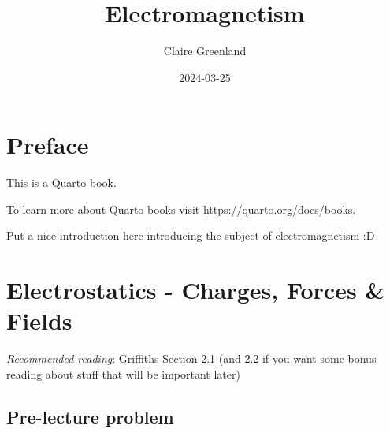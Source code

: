 \documentclass[
  letterpaper,
  DIV=11,
  numbers=noendperiod]{scrreprt}
\title{Electromagnetism}
\author{Claire Greenland}
\date{2024-03-25}
\renewcommand*\contentsname{Table of contents}
\newcommand\contentsname{Table of contents}
\begin{document}
\maketitle

\renewcommand*\contentsname{Table of contents}
{
\hypersetup{linkcolor=}
\setcounter{tocdepth}{2}
\tableofcontents
}

\chapter*{Preface}\label{preface}


This is a Quarto book.

To learn more about Quarto books visit
\url{https://quarto.org/docs/books}.

Put a nice introduction here introducing the subject of electromagnetism
:D


\chapter{Electrostatics - Charges, Forces \&
Fields}\label{electrostatics---charges-forces-fields}

\newcommand{\l}{\mathrm{\mathbf{l}}}
\newcommand{\E}{\mathrm{\mathbf{E}}}
\newcommand{\F}{\mathrm{\mathbf{F}}}
\newcommand{\r}{\mathrm{\mathbf{r}}}
\newcommand{\B}{\mathrm{\mathbf{B}}}
\newcommand{\A}{\mathrm{\mathbf{A}}}
\newcommand{\x}{\mathrm{\mathbf{x}}}
\newcommand{\y}{\mathrm{\mathbf{y}}}
\newcommand{\z}{\mathrm{\mathbf{z}}}
\newcommand{\v}{\mathrm{\mathbf{v}}}
\newcommand{\p}{\mathrm{\mathbf{p}}}
\newcommand{\d}{\mathrm{\mathbf{d}}}

\newcommand{\a}{\mathrm{\mathbf{a}}}
\newcommand{\b}{\mathrm{\mathbf{b}}}
\newcommand{\I}{\mathrm{\mathbf{I}}}
\newcommand{\K}{\mathrm{\mathbf{K}}}
\newcommand{\J}{\mathrm{\mathbf{J}}}
\newcommand{\A}{\mathrm{\mathbf{A}}}
\newcommand{\dd}{\mathrm{d}}

\emph{Recommended reading}: Griffiths Section 2.1 (and 2.2 if you want
some bonus reading about stuff that will be important later)

\section{Pre-lecture problem}\label{pre-lecture-problem}
\end{document}
